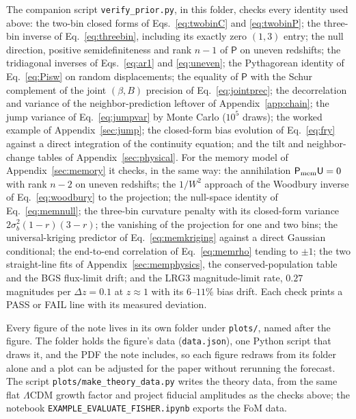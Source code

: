 \documentclass[11pt]{article}
\newcommand{\Prec}{\mathsf{P}}
\begin{document}
The companion script \texttt{verify\_prior.py}, in this folder, checks
every identity used above: the two-bin closed forms of
Eqs.~\eqref{eq:twobinC} and \eqref{eq:twobinP}; the three-bin inverse
of Eq.~\eqref{eq:threebin}, including its exactly zero $(1,3)$ entry;
the null direction, positive semidefiniteness and rank $n-1$ of $\Prec$
on uneven redshifts; the tridiagonal inverses of Eqs.~\eqref{eq:ar1}
and \eqref{eq:uneven}; the Pythagorean identity of Eq.~\eqref{eq:Pisw}
on random displacements; the equality of $\Prec$ with the Schur
complement of the joint $(\beta, B)$ precision of
Eq.~\eqref{eq:jointprec}; the decorrelation and variance of the
neighbor-prediction leftover of Appendix~\ref{app:chain}; the jump
variance of Eq.~\eqref{eq:jumpvar}
by Monte Carlo ($10^5$ draws); the worked example of
Appendix~\ref{sec:jump}; the closed-form bias evolution of
Eq.~\eqref{eq:fry} against a direct integration of the continuity
equation; and the tilt and neighbor-change tables of
Appendix~\ref{sec:physical}.  For the memory model of
Appendix~\ref{sec:memory} it checks, in the same way: the annihilation
$\Prec_{\rm mem}\mathsf{U} = 0$ with rank $n - 2$ on uneven
redshifts; the $1/W^2$ approach of the Woodbury inverse of
Eq.~\eqref{eq:woodbury} to the projection; the null-space identity
of Eq.~\eqref{eq:memnull}; the three-bin curvature penalty with its
closed-form variance $2\sigma_b^2(1-r)(3-r)$; the vanishing of the
projection for one and two bins; the universal-kriging predictor of
Eq.~\eqref{eq:memkriging} against a direct Gaussian conditional; the
end-to-end correlation of Eq.~\eqref{eq:memrho} tending to $\pm 1$;
the two straight-line fits of Appendix~\ref{sec:memphysics}, the
conserved-population table and the BGS flux-limit drift; and the
LRG3 magnitude-limit rate, $0.27$ magnitudes per $\Delta z = 0.1$ at
$z \approx 1$ with its $6$--$11\%$ bias drift.  Each check
prints a PASS or FAIL line with its measured deviation.

Every figure of the note lives in its own folder under
\texttt{plots/}, named after the figure.  The folder holds the
figure's data (\texttt{data.json}), one Python script that draws it,
and the PDF the note includes, so each figure redraws from its
folder alone and a plot can be adjusted for the paper without
rerunning the forecast.  The script
\texttt{plots/make\_theory\_data.py} writes the theory data, from
the same flat $\Lambda$CDM growth factor and project fiducial
amplitudes as the checks above; the notebook
\texttt{EXAMPLE\_EVALUATE\_FISHER.ipynb} exports the FoM data.
\end{document}

